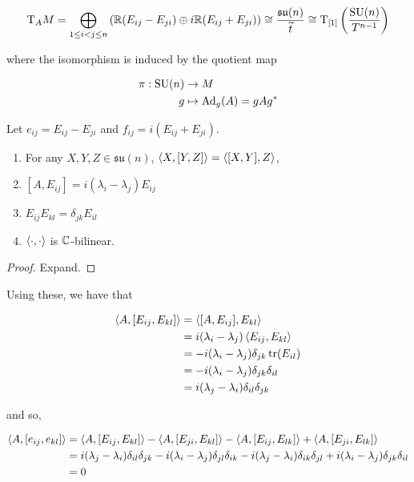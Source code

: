 \documentclass{article}
\DeclareMathOperator{\SU}{SU}
\newcommand{\su}{\mathfrak{su}}
\renewcommand{\tilde}{\widetilde}
\begin{document}
\[\T_A M = \bigoplus_{1 \le i < j \le n} \left(\R(E_{ij} - E_{ji}) \oplus i\R (E_{ij} + E_{ji})\right) \cong \frac{\su(n)}{\tilde t} \cong \T_{[1]}\left(\frac{\SU(n)}{T^{n-1}}\right)\]

where the isomorphism is induced by the quotient map

\begin{align*}
    \pi : \SU(n) &\to M \\
    g &\mapsto \Ad_g(A) = gAg^*
\end{align*}

Let \(e_{ij} = E_{ij} - E_{ji}\) and \(f_{ij} = i(E_{ij} + E_{ji})\).

\begin{lemma}
    \begin{enumerate}
        \item For any \(X, Y, Z \in \su(n)\), \(\left\langle X, [Y, Z] \right\rangle = \left\langle [X, Y], Z \right\rangle\),
        \item \([A, E_{ij}] = i(\lambda_i - \lambda_j)E_{ij}\)
        \item \(E_{ij}E_{kl} = \delta_{jk}E_{il}\)
        \item \(\left\langle \cdot, \cdot \right\rangle\) is \(\mathbb{C}\)-bilinear.
    \end{enumerate}
\end{lemma}

\begin{proof}
    Expand.
\end{proof}

Using these, we have that

\begin{align*}
    \left\langle A, [E_{ij}, E_{kl}] \right\rangle &= \left\langle [A, E_{ij}], E_{kl} \right\rangle \\
    &= i(\lambda_i - \lambda_j)\left\langle E_{ij}, E_{kl} \right\rangle \\
    &= -i(\lambda_i - \lambda_j)\delta_{jk}\tr(E_{il}) \\
    &= -i(\lambda_i - \lambda_j)\delta_{jk}\delta_{il} \\
    &= i(\lambda_j - \lambda_i)\delta_{il}\delta_{jk}
\end{align*}

and so,

\begin{align*}
    \left\langle A, [e_{ij}, e_{kl}] \right\rangle &= \left\langle A, [E_{ij}, E_{kl}] \right\rangle - \left\langle A, [E_{ji}, E_{kl}] \right\rangle - \left\langle A, [E_{ij}, E_{lk}] \right\rangle + \left\langle A, [E_{ji}, E_{lk}] \right\rangle \\
    &= i(\lambda_j - \lambda_i)\delta_{il}\delta_{jk} - i(\lambda_i - \lambda_j)\delta_{jl}\delta_{ik} - i(\lambda_j - \lambda_i)\delta_{ik}\delta_{jl} + i(\lambda_i - \lambda_j)\delta_{jk}\delta_{il} \\
    &= 0
\end{align*}
\end{document}
